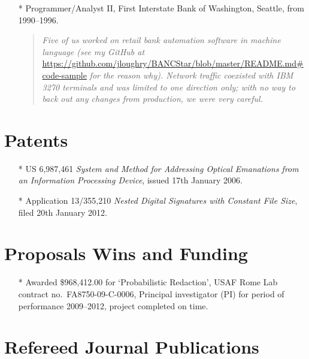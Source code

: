 \documentclass[letterpaper]{article}
\begin{document}
\begin{itemize}
	\item[*] Programmer/Analyst II, First Interstate Bank of Washington, Seattle, from 1990--1996.

		\begin{quote}\vspace{-2mm}
			\emph{Five of us worked on retail bank automation software in machine language
			(see my GitHub at}
			\url{https://github.com/jloughry/BANCStar/blob/master/README.md#code-sample}
			\emph{for the reason why).  Network traffic coexisted with IBM 3270 terminals
			and was limited to one direction only; with no way to back out any changes from
			production, we were very careful.}

		\end{quote}

\end{itemize}

\section*{Patents} %

\begin{itemize}
    \item[*] US 6,987,461 \emph{System and Method for Addressing Optical
		Emanations from an Information Processing Device}, issued 17th January 2006.

	\item[*] Application 13/355,210 \emph{Nested Digital Signatures with Constant File Size},
		filed 20th January 2012.
\end{itemize}

\section*{Proposals Wins and Funding}

\begin{itemize}
	\item[*] Awarded \$968,412.00 for `Probabilistic Redaction', USAF Rome Lab contract
	no.\ FA8750-09-C-0006, Principal investigator (PI) for period of performance
	2009--2012, project completed on time.
\end{itemize}

\section*{Refereed Journal Publications} %
\end{document}
